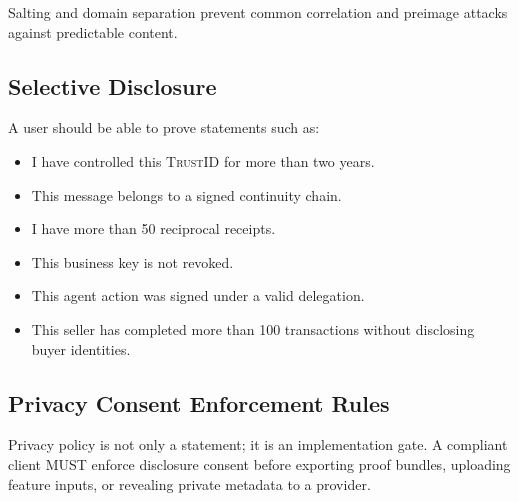 \documentclass[11pt]{article}
\newcommand{\TrustID}{\textsc{TrustID}}
\begin{document}
Salting and domain separation prevent common correlation and preimage attacks against predictable content.

\subsection{Selective Disclosure}

A user should be able to prove statements such as:

\begin{itemize}
    \item I have controlled this \TrustID{} for more than two years.
    \item This message belongs to a signed continuity chain.
    \item I have more than 50 reciprocal receipts.
    \item This business key is not revoked.
    \item This agent action was signed under a valid delegation.
    \item This seller has completed more than 100 transactions without disclosing buyer identities.
\end{itemize}



\subsection{Privacy Consent Enforcement Rules}

Privacy policy is not only a statement; it is an implementation gate. A compliant client MUST enforce disclosure consent before exporting proof bundles, uploading feature inputs, or revealing private metadata to a provider.
\end{document}
